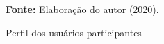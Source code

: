 \begin{figure}[ht!]
\centering

\caption{\textmd{Perfil dos usuários participantes}}
\label{fig:perfilusuarios}

\par\medskip\textbf{Fonte:} Elaboração do autor (2020). \par\medskip

\end{figure}
